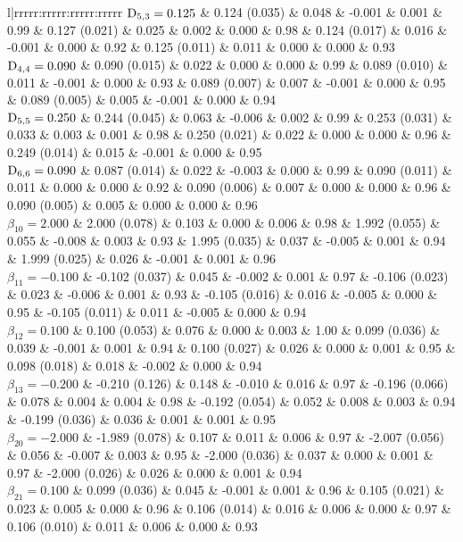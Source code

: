 \begin{landscape}
\begin{table}[ht]
\begin{tabular}{l|rrrrr:rrrrr:rrrrr:rrrrr}
  $\mathrm{D}_{5,3} = 0.125$ &  0.124 (0.035) & 0.048 & -0.001 & 0.001 & 0.99 &  0.127 (0.021) & 0.025 &  0.002 & 0.000 & 0.98 &  0.124 (0.017) & 0.016 & -0.001 & 0.000 & 0.92 &  0.125 (0.011) & 0.011 &  0.000 & 0.000 & 0.93 \\ 
  $\mathrm{D}_{4,4} = 0.090$ &  0.090 (0.015) & 0.022 &  0.000 & 0.000 & 0.99 &  0.089 (0.010) & 0.011 & -0.001 & 0.000 & 0.93 &  0.089 (0.007) & 0.007 & -0.001 & 0.000 & 0.95 &  0.089 (0.005) & 0.005 & -0.001 & 0.000 & 0.94 \\ 
  $\mathrm{D}_{5,5} = 0.250$ &  0.244 (0.045) & 0.063 & -0.006 & 0.002 & 0.99 &  0.253 (0.031) & 0.033 &  0.003 & 0.001 & 0.98 &  0.250 (0.021) & 0.022 &  0.000 & 0.000 & 0.96 &  0.249 (0.014) & 0.015 & -0.001 & 0.000 & 0.95 \\ 
  $\mathrm{D}_{6,6} = 0.090$ &  0.087 (0.014) & 0.022 & -0.003 & 0.000 & 0.99 &  0.090 (0.011) & 0.011 &  0.000 & 0.000 & 0.92 &  0.090 (0.006) & 0.007 &  0.000 & 0.000 & 0.96 &  0.090 (0.005) & 0.005 &  0.000 & 0.000 & 0.96 \\ 
  $\beta_{10} = 2.000$ &  2.000 (0.078) & 0.103 &  0.000 & 0.006 & 0.98 &  1.992 (0.055) & 0.055 & -0.008 & 0.003 & 0.93 &  1.995 (0.035) & 0.037 & -0.005 & 0.001 & 0.94 &  1.999 (0.025) & 0.026 & -0.001 & 0.001 & 0.96 \\ 
  $\beta_{11} = -0.100$ & -0.102 (0.037) & 0.045 & -0.002 & 0.001 & 0.97 & -0.106 (0.023) & 0.023 & -0.006 & 0.001 & 0.93 & -0.105 (0.016) & 0.016 & -0.005 & 0.000 & 0.95 & -0.105 (0.011) & 0.011 & -0.005 & 0.000 & 0.94 \\ 
  $\beta_{12} = 0.100$ &  0.100 (0.053) & 0.076 &  0.000 & 0.003 & 1.00 &  0.099 (0.036) & 0.039 & -0.001 & 0.001 & 0.94 &  0.100 (0.027) & 0.026 &  0.000 & 0.001 & 0.95 &  0.098 (0.018) & 0.018 & -0.002 & 0.000 & 0.94 \\ 
  $\beta_{13} = -0.200$ & -0.210 (0.126) & 0.148 & -0.010 & 0.016 & 0.97 & -0.196 (0.066) & 0.078 &  0.004 & 0.004 & 0.98 & -0.192 (0.054) & 0.052 &  0.008 & 0.003 & 0.94 & -0.199 (0.036) & 0.036 &  0.001 & 0.001 & 0.95 \\ 
  $\beta_{20} = -2.000$ & -1.989 (0.078) & 0.107 &  0.011 & 0.006 & 0.97 & -2.007 (0.056) & 0.056 & -0.007 & 0.003 & 0.95 & -2.000 (0.036) & 0.037 &  0.000 & 0.001 & 0.97 & -2.000 (0.026) & 0.026 &  0.000 & 0.001 & 0.94 \\ 
  $\beta_{21} = 0.100$ &  0.099 (0.036) & 0.045 & -0.001 & 0.001 & 0.96 &  0.105 (0.021) & 0.023 &  0.005 & 0.000 & 0.96 &  0.106 (0.014) & 0.016 &  0.006 & 0.000 & 0.97 &  0.106 (0.010) & 0.011 &  0.006 & 0.000 & 0.93 \\ 

\end{tabular}
\end{table}
\end{landscape}
